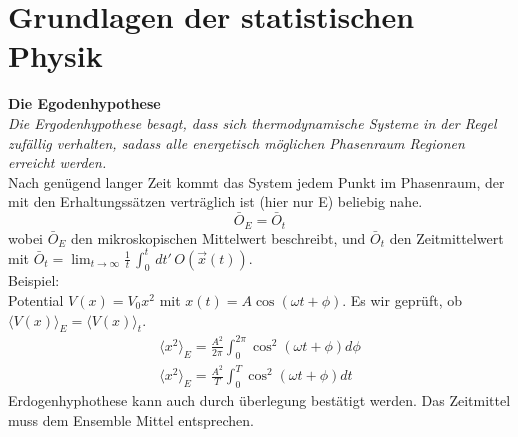 \documentclass[a4paper,11pt]{scrartcl}
\begin{document}
\section{Grundlagen der statistischen Physik}
\textbf{Die Egodenhypothese}\\
\textit{Die Ergodenhypothese besagt, dass sich thermodynamische Systeme in der Regel zufällig verhalten, sadass alle energetisch möglichen Phasenraum Regionen erreicht werden.}\\
Nach genügend langer Zeit kommt das System jedem Punkt im Phasenraum, der mit den Erhaltungssätzen verträglich ist (hier nur E) beliebig nahe. 
\begin{equation}
 \bar{O}_E = \bar{O}_t
\end{equation}
wobei $\bar{O}_E$ den mikroskopischen Mittelwert beschreibt, 
und $\bar{O}_t$ den Zeitmittelwert mit $\bar{O}_t = \lim_{t \to \infty} \frac{1}{t} \, \int_0^t \, dt' \, O(\vec{x}(t))$.\\
Beispiel:\\
Potential $V(x)= V_0 x^2$ mit $x(t) = A \cos(\omega t + \phi)$. Es wir geprüft, ob $ \langle V(x) \rangle_E = \langle V(x) \rangle_t $.
\begin{equation}
  \begin{split}
    \langle x^2 \rangle_E = \frac{A^2}{2 \pi} \int_0^{2 \pi} \cos^2(\omega t + \phi) d \phi\\
    \langle x^2 \rangle_E = \frac{A^2}{T} \int_0^{T} \cos^2(\omega t + \phi) d t
  \end{split}
\end{equation}
Erdogenhyphothese kann auch durch überlegung bestätigt werden. Das Zeitmittel muss dem Ensemble Mittel entsprechen.
\end{document}

